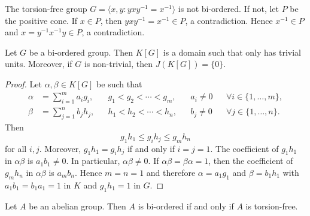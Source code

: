 \begin{example}
	The torsion-free group $G=\langle x,y:yxy^{-1}=x^{-1}\rangle$ is not bi-ordered. 
	If not, let $P$ 
	be the positive cone. If $x\in P$, 
	then $yxy^{-1}=x^{-1}\in P$, a contradiction. Hence $x^{-1}\in P$
	and $x=y^{-1}x^{-1}y\in P$, a contradiction.
\end{example}

\begin{theorem}
	\label{thm:BO}
	Let $G$ be a bi-ordered group. Then $K[G]$ is a domain such that
	only has trivial units. Moreover, if $G$ is non-trivial, 
	then $J(K[G])=\{0\}$. 
\end{theorem}

\begin{proof}
	Let $\alpha,\beta\in K[G]$ be such that  
	\begin{align*}
		\alpha&=\sum_{i=1}^m a_ig_i, && g_1<g_2<\cdots<g_m,&& a_i\ne 0 && \forall i\in\{1,\dots,m\},\\
		\beta&=\sum_{j=1}^n b_jh_j, && h_1<h_2<\cdots<h_n, && b_j\ne 0 && \forall j\in\{1,\dots,n\}.
	\end{align*}
	Then 
	\[
		g_1h_1\leq g_ih_j\leq g_mh_n
	\]
	for all $i,j$. Moreover, $g_1h_1=g_ih_j$ if and only if $i=j=1$. The
	coefficient of $g_1h_1$ in $\alpha\beta$ is $a_1b_1\ne 0$. In particular, 
	$\alpha\beta\ne0$. If $\alpha\beta=\beta\alpha=1$, then the coefficient of
	$g_mh_n$ in $\alpha\beta$ is $a_mb_n$. Hence $m=n=1$ and therefore 
	$\alpha=a_1g_1$ and $\beta=b_1h_1$ with $a_1b_1=b_1a_1=1$ in $K$ and $g_1h_1=1$
	in $G$.
\end{proof}

\begin{theorem}[Levi]
	\label{thm:Levi}
	Let $A$ be an abelian group. Then $A$ is bi-ordered if and only
	if $A$ is torsion-free.
\end{theorem}

